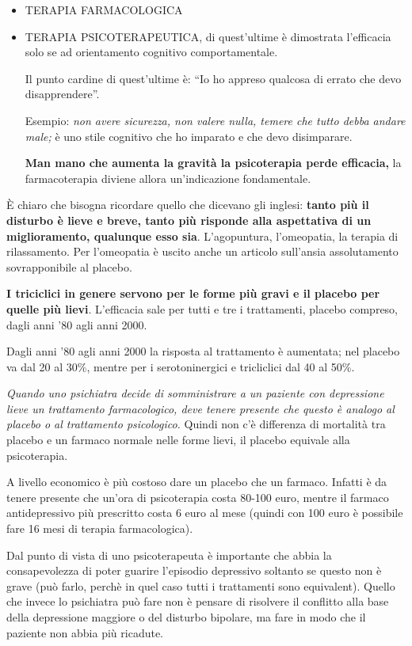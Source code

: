 \documentclass[]{article}
\begin{document}
\begin{itemize}
\item
  TERAPIA FARMACOLOGICA
\item
  TERAPIA PSICOTERAPEUTICA, di quest'ultime è dimostrata l'efficacia
  solo se ad orientamento cognitivo comportamentale.

  Il punto cardine di quest'ultime è: ``Io ho appreso qualcosa di errato
  che devo disapprendere''.

  Esempio: \emph{non avere sicurezza, non valere nulla, temere che tutto
  debba andare male;} è uno stile cognitivo che ho imparato e che devo
  disimparare.

  \textbf{Man mano che aumenta la gravità la psicoterapia perde
  efficacia,} la farmacoterapia diviene allora un'indicazione
  fondamentale.
\end{itemize}

È chiaro che bisogna ricordare quello che dicevano gli inglesi:
\textbf{tanto più il disturbo è lieve e breve, tanto più risponde alla
aspettativa di un miglioramento, qualunque esso sia}. L'agopuntura,
l'omeopatia, la terapia di rilassamento. Per l'omeopatia è uscito anche
un articolo sull'ansia assolutamento sovrapponibile al placebo.

\textbf{I triciclici in genere servono per le forme più gravi e il
placebo per quelle più lievi}. L'efficacia sale per tutti e tre i
trattamenti, placebo compreso, dagli anni '80 agli anni 2000.

Dagli anni '80 agli anni 2000 la risposta al trattamento è aumentata;
nel placebo va dal 20 al 30\%, mentre per i serotoninergici e
tricliclici dal 40 al 50\%.

\emph{\emph{Quando uno psichiatra decide di somministrare a un paziente
con depressione lieve un trattamento farmacologico, deve tenere presente
che questo è analogo al placebo o al trattamento psicologico.}} Quindi
non c'è differenza di mortalità tra placebo e un farmaco normale nelle
forme lievi, il placebo equivale alla psicoterapia.

A livello economico è più costoso dare un placebo che un farmaco.
Infatti è da tenere presente che un'ora di psicoterapia costa 80-100
euro, mentre il farmaco antidepressivo più prescritto costa 6 euro al
mese (quindi con 100 euro è possibile fare 16 mesi di terapia
farmacologica).

Dal punto di vista di uno psicoterapeuta è importante che abbia la
consapevolezza di poter guarire l'episodio depressivo soltanto se questo
non è grave (può farlo, perchè in quel caso tutti i trattamenti sono
equivalent). Quello che invece lo psichiatra può fare non è pensare di
risolvere il conflitto alla base della depressione maggiore o del
disturbo bipolare, ma fare in modo che il paziente non abbia più
ricadute.
\end{document}
